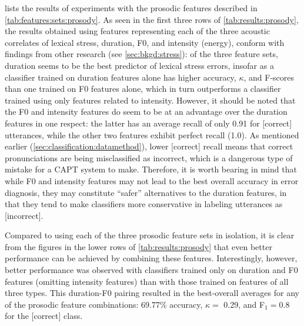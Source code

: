 		 lists the results of experiments with the prosodic features described in \cref{tab:features:sets:prosody}. As seen in the first three rows of \cref{tab:results:prosody}, the results obtained using features representing each of the three acoustic correlates of lexical stress, duration, F0, and intensity (energy), 
		conform with findings from other research 
		(see \cref{sec:bkgd:stress}): of the three feature sets, duration seems to be the best predictor of lexical stress errors, insofar as a classifier trained on duration features alone has higher accuracy, $\kappa$, and F-scores than one trained on F0 features alone, which in turn outperforms a classifier trained using only features related to intensity. However, it should be noted that the F0 and intensity features do seem to be at an advantage over the duration features in one respect: the latter has an average recall of only 0.91 for [correct] utterances, while the other two features exhibit perfect recall (1.0). As mentioned earlier (\cref{sec:classification:datamethod}), lower [correct] recall means that correct pronunciations are being misclassified as incorrect, which is a dangerous type of mistake for a CAPT system to make. Therefore, it is worth bearing in mind that while F0 and intensity features may not lead to the best overall accuracy in error diagnosis, they may constitute ``safer'' alternatives to the duration features, in that they tend to make classifiers more conservative in labeling utterances as [incorrect]. 
		
		Compared to using each of the three prosodic feature sets in isolation, it is clear from the figures in the lower rows of \cref{tab:results:prosody} that even better performance can be achieved by combining these features. Interestingly, however, 
		better performance was observed with classifiers trained only on duration and F0 features (omitting intensity features) than with those trained on features of all three types.
		This duration-F0 pairing resulted in the best-overall averages for any of the prosodic feature combinations: 69.77\% accuracy, $\kappa = $ 0.29, and F$_1 = 0.8$ for the [correct] class.
		
		
		
